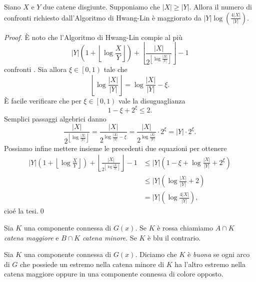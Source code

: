 \begin{lemma}
	\label{hwanglinlemma} Siano \(X\) e \(Y\) due catene disgiunte. Supponiamo che \(|X|\ge|Y|\). Allora il numero di confronti richiesto dall'Algoritmo di Hwang-Lin è maggiorato da \(|Y|\log(\frac{4|X|}{|Y|})\). 
\end{lemma}
\begin{proof}
	È noto che l'Algoritmo di Hwang-Lin compie al più
	\[|Y|\left(1+\left\lfloor{\log{\frac{X}{Y}}}\right\rfloor\right)+\left\lfloor\frac{|X|}{2^{\left\lfloor\log{\frac{|X|}{|Y|}}\right\rfloor}}\right\rfloor-1\]
	confronti \cite{Hwang1972}. Sia allora \(\xi\in\left[0,1\right)\) tale che
	\[\left\lfloor\log{\frac{|X|}{|Y|}}\right\rfloor=\log{\frac{|X|}{|Y|}}-\xi.\]
	È facile verificare che per \(\xi\in\left[0,1\right)\) vale la disuguaglianza
	\[1-\xi+2^{\xi}\le 2.\]
	Semplici passaggi algebrici danno
	\[\frac{|X|}{2^{\left\lfloor\log{\frac{|X|}{|Y|}}\right\rfloor}}=\frac{|X|}{2^{\log{\frac{|X|}{|Y|}}-\xi}}=\frac{|X|}{2^{\log{\frac{|X|}{|Y|}}}}\cdot 2^{\xi}=|Y|\cdot 2^{\xi}.\]
	Possiamo infine mettere insieme le precedenti due equazioni per ottenere 
	\begin{align}
		|Y|\left(1+\left\lfloor{\log{\frac{X}{Y}}}\right\rfloor\right)+\left\lfloor\frac{|X|}{2^{\left\lfloor\log{\frac{|X|}{|Y|}}\right\rfloor}}\right\rfloor-1&\le|Y|\left(1-\xi+\log{\frac{|X|}{|Y|}}+2^{\xi}\right) \nonumber \\
		&\le |Y|\left(\log{\frac{|X|}{|Y|}}+2\right) \nonumber \\
		&= |Y|\left(\log{\frac{4|X|}{|Y|}}\right), \nonumber 
	\end{align}
	cioé la tesi.\qed 
\end{proof}
\begin{definition}
	Sia \(K\) una componente connessa di \(G(x)\). Se \(K\) è rossa chiamiamo \(A\cap K\) \emph{catena maggiore} e \(B\cap K\) \emph{catena minore}. Se \(K\) è blu il contrario. 
\end{definition}
\begin{definition}
	Sia \(K\) una componente connessa di \(G(x)\). Diciamo che \(K\) è \emph{buona} se ogni arco di \(G\) che possiede un estremo nella catena minore di \(K\) ha l'altro estremo nella catena maggiore oppure in una componente connessa di colore opposto. 
\end{definition}
